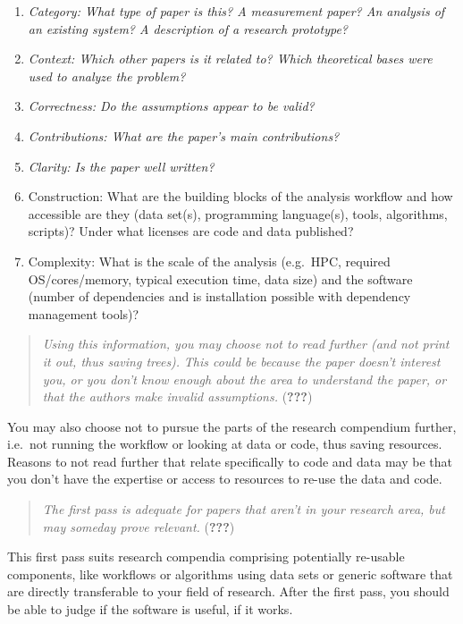 \documentclass[twocolumn]{article}
\providecommand{\tightlist}{%
  \setlength{\itemsep}{0pt}\setlength{\parskip}{0pt}}
\begin{document}
\begin{enumerate}
\def\labelenumi{\arabic{enumi}.}
\tightlist
\item
  \emph{Category: What type of paper is this? A measurement paper? An
  analysis of an existing system? A description of a research
  prototype?}
\item
  \emph{Context: Which other papers is it related to? Which theoretical
  bases were used to analyze the problem?}
\item
  \emph{Correctness: Do the assumptions appear to be valid?}
\item
  \emph{Contributions: What are the paper's main contributions?}
\item
  \emph{Clarity: Is the paper well written?}
\item
  Construction: What are the building blocks of the analysis workflow
  and how accessible are they (data set(s), programming language(s),
  tools, algorithms, scripts)? Under what licenses are code and data
  published?
\item
  Complexity: What is the scale of the analysis (e.g.~HPC, required
  OS/cores/memory, typical execution time, data size) and the software
  (number of dependencies and is installation possible with dependency
  management tools)?
\end{enumerate}

\begin{quote}
\emph{Using this information, you may choose not to read further (and
not print it out, thus saving trees).} \emph{This could be because the
paper doesn't interest you, or you don't know enough about the area to
understand the paper, or that the authors make invalid assumptions.}
({\textbf{???}})
\end{quote}

You may also choose not to pursue the parts of the research compendium
further, i.e.~not running the workflow or looking at data or code, thus
saving resources. Reasons to not read further that relate specifically
to code and data may be that you don't have the expertise or access to
resources to re-use the data and code.

\begin{quote}
\emph{The first pass is adequate for papers that aren't in your research
area, but may someday prove relevant.} ({\textbf{???}})
\end{quote}

This first pass suits research compendia comprising potentially
re-usable components, like workflows or algorithms using data sets or
generic software that are directly transferable to your field of
research. After the first pass, you should be able to judge if the
software is useful, if it works.
\end{document}
